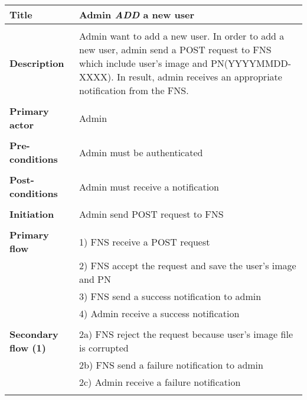 \documentclass[a4paper,11pt]{article}
\begin{document}
\begin{tabular}{|p{4cm}|p{10cm}|} \hline
    \textbf{Title} &   Admin \emph{ADD} a new user
        
    \\ \hline \rowcolor{Gray} & \\ \hline
        
    \textbf{Description} &  Admin want to add a new user. In order to add a new user, admin send a POST request to FNS which include user's image and PN(YYYYMMDD-XXXX). In result, admin receives an appropriate notification from the FNS.
        
    \\ \hline \rowcolor{Gray} & \\ \hline
        
    \textbf{Primary actor} & Admin  
        
    \\ \hline \rowcolor{Gray} & \\ \hline 
          
    \textbf{Pre-conditions} &   Admin must be authenticated
        
    \\ \hline \rowcolor{Gray} & \\ \hline
         
    \textbf{Post-conditions} &   Admin must receive a notification
        
    \\ \hline \rowcolor{Gray} & \\ \hline 
         
    \textbf{Initiation} & Admin send POST request to FNS
        
    \\ \hline \rowcolor{Gray} & \\ \hline 
         
    \textbf{Primary flow} & 
    1) FNS receive a POST request \\&
    2) FNS accept the request and save the user's image and PN \\&
    3) FNS send a success notification to admin \\&
    4) Admin receive a success notification
        
    \\ \hline \rowcolor{Gray} & \\ \hline 
         
    \textbf{Secondary flow (1)} & 
    2a) FNS reject the request because user's image file is corrupted \\&
    2b) FNS send a failure notification to admin\\&
    2c) Admin receive a failure notification \\& 
     

\end{tabular}
\end{document}
